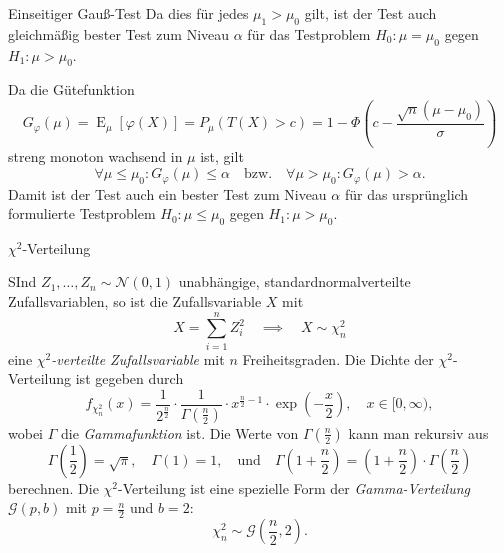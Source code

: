 \begin{defi}{Einseitiger Gauß-Test}
    Da dies für jedes $\mu_1 > \mu_0$ gilt, ist der Test auch gleichmäßig bester Test zum Niveau $\alpha$ für das Testproblem $H_0: \mu = \mu_0$ gegen $H_1: \mu > \mu_0$.

    Da die Gütefunktion
    \[
        G_{\varphi}(\mu) = \operatorname{E}_{\mu}[\varphi(X)] = P_{\mu}(T(X) > c) = 1 - \Phi \left( c - \frac{\sqrt{n} (\mu - \mu_0)}{\sigma} \right)
    \]
    streng monoton wachsend in $\mu$ ist, gilt
    \[
        \forall \mu \leq \mu_0 : G_{\varphi}(\mu) \leq \alpha \quad \text{bzw.} \quad \forall \mu > \mu_0 : G_{\varphi}(\mu) > \alpha.
    \]
    Damit ist der Test auch ein bester Test zum Niveau $\alpha$ für das ursprünglich formulierte Testproblem $H_0: \mu \leq \mu_0$ gegen $H_1: \mu > \mu_0$.
\end{defi}

\begin{defi}{$\chi^2$-Verteilung}

    SInd $Z_1, \ldots, Z_n \sim \mathcal{N}(0, 1)$ unabhängige, standardnormalverteilte Zufallsvariablen, so ist die Zufallsvariable $X$ mit
    \[
        X = \sum_{i = 1}^{n} Z_i^2 \quad \implies \quad X \sim \chi^2_n
    \]
    eine \emph{$\chi^2$-verteilte Zufallsvariable} mit $n$ Freiheitsgraden.
    Die Dichte der $\chi^2$-Verteilung ist gegeben durch
    \[
        f_{\chi^2_n}(x) = \frac{1}{2^{\frac{n}{2}}} \cdot \frac{1}{\Gamma\left(\frac{n}{2}\right)} \cdot x^{\frac{n}{2} - 1} \cdot \exp \left( -\frac{x}{2} \right), \quad x \in [0, \infty),
    \]
    wobei $\Gamma$ die \emph{Gammafunktion} ist.
    Die Werte von $\Gamma(\frac{n}{2})$ kann man rekursiv aus
    \[
        \Gamma \left( \frac{1}{2} \right) = \sqrt{\pi}, \quad \Gamma(1) = 1, \quad \text{und} \quad \Gamma\left(1 + \frac{n}{2}\right) = \left(1 + \frac{n}{2}\right) \cdot \Gamma\left(\frac{n}{2}\right)
    \]
    berechnen.
    Die $\chi^2$-Verteilung ist eine spezielle Form der \emph{Gamma-Verteilung} $\mathcal{G}(p, b)$ mit $p = \frac{n}{2}$ und $b = 2$:
    \[
        \chi^2_n \sim \mathcal{G}\left(\frac{n}{2}, 2\right).
    \]



\end{defi}
